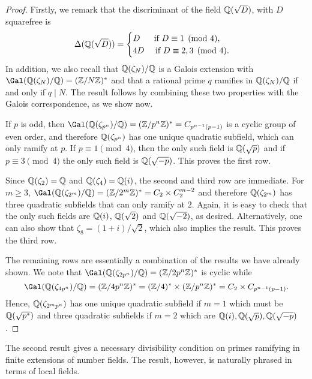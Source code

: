 \begin{proof}
    Firstly, we remark that the discriminant of the field $\mathbb{Q}(\sqrt{D})$, with $D$ squarefree is
    \begin{equation}
        \Delta(\mathbb{Q}(\sqrt{D}))=
        \begin{cases}
            D \ \quad\text{  if } D\equiv1\pmod{4},\\
            4D \quad\text{ if } D\equiv2,3\pmod{4}.
        \end{cases}
    \end{equation}
    In addition, we also recall that $\mathbb{Q}(\zeta_N)/\mathbb{Q}$ is a Galois extension with $\Gal(\QQ(\zeta_N)/\QQ)=(\ZZ/N\ZZ)^*$ and that a rational prime $q$ ramifies in $\mathbb{Q}(\zeta_N)/\mathbb{Q}$ if and only if $q\mid N$. The result follows by combining these two properties with the Galois correspondence, as we show now.

    If $p$ is odd, then $\Gal(\QQ(\zeta_{p^n})/\QQ)=(\ZZ/p^n\ZZ)^*=C_{p^{n-1}(p-1)}$ is a cyclic group of even order, and therefore $\mathbb{Q}(\zeta_{p^n})$ has one unique quadratic subfield, which can only ramify at $p$. If $p\equiv1\pmod{4}$, then the only such field is $\mathbb{Q}(\sqrt{p})$ and if $p\equiv3\pmod{4}$ the only such field is $\mathbb{Q}(\sqrt{-p})$. This proves the first row. 

    Since $\mathbb{Q}(\zeta_2)=\mathbb{Q}$ and $\mathbb{Q}(\zeta_4)=\mathbb{Q}(i)$, the second and third row are immediate. For $m\geq3$, $\Gal(\QQ(\zeta_{2^m})/\QQ)=(\ZZ/2^m\ZZ)^*=C_2\times C_2^{m-2}$ and therefore $\mathbb{Q}(\zeta_{2^m})$ has three quadratic subfields that can only ramify at $2$. Again, it is easy to check that the only such fields are $\mathbb{Q}(i)$, $\mathbb{Q}(\sqrt{2})$ and $\mathbb{Q}(\sqrt{-2})$, as desired. Alternatively, one can also show that $\zeta_8=(1+i)/\sqrt{2}$, which also implies the result. This proves the third row.

    The remaining rows are essentially a combination of the results we have already shown. We note that $\Gal(\QQ(\zeta_{2p^n})/\QQ)=(\ZZ/2p^n\ZZ)^*$ is cyclic while 
    $$\Gal(\QQ(\zeta_{4p^n})/\QQ)=(\ZZ/4p^n\ZZ)^*=(\ZZ/4)^*\times(\ZZ/p^n\ZZ)^*=C_2\times C_{p^{n-1}(p-1)}.$$
    Hence, $\mathbb{Q}(\zeta_{2^mp^n})$ has one unique quadratic subfield if $m=1$ which must be $\mathbb{Q}(\sqrt{p^*})$ and three quadratic subfields if $m=2$ which are $\mathbb{Q}(i),\mathbb{Q}(\sqrt{p}),\mathbb{Q}(\sqrt{-p})$.
\end{proof}

The second result gives a necessary divisibility condition on primes ramifying in finite extensions of number fields. The result, however, is naturally phrased in terms of local fields.

